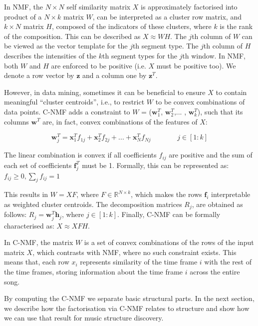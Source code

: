 In NMF, the $N \times N$ self similarity matrix $X$ is approximately factorised into product of a $N \times k$ matrix $W$, can be interpreted as a cluster row matrix, and $k \times N$ matrix $H$, composed of the indicators of these clusters, where $k$ is the rank of the composition. This can be described as $X \approx WH$. The $j$th column of $W$ can be viewed as the vector template for the $j$th segment type. The $j$th column of $H$ describes the intensities of the $k$th segment types for the $j$th window. In NMF, both $W$ and $H$ are enforced to be positive (i.e. $X$ must be positive too). We denote a row vector by $\boldsymbol{z}$ and a column one by $\boldsymbol{z}^{T}$.

However, in data mining, sometimes it can be beneficial to ensure $X$ to contain meaningful “cluster centroids”, i.e., to restrict $W$ to be convex combinations of data points.
C-NMF adds a constraint to $W$ = ($\boldsymbol{w}_{1}^{T}$, $\boldsymbol{w}_{2}^{T}$,... ,  $\boldsymbol{w}_{k}^{T}$),  such that its columns  $\boldsymbol{w}^{T}$  are, in fact,  convex combinations of the features of $X$:

\begin{equation}
\boldsymbol{w}_{j}^{T} = \boldsymbol{x}_{1}^{T}f_{1j} + \boldsymbol{x}_{2}^{T}f_{2j} + ... + \boldsymbol{x}_{N}^{T}f_{Nj}  \hspace{45pt}   j \in [1 : k]
\end{equation}

The linear combination is convex if all coefficients $f_{ij}$ are positive and the sum of each set of coefficients  $\boldsymbol{f}^{T}_{j}$ must be 1. Formally, this can be represented as:
$f_{ij} \geq 0,  \sum\nolimits_{j} f_{ij} = 1 $

This results in $W = XF$, where $F \in \mathbb{R}^{N \times k}$, which makes the rows $\boldsymbol{f}_{i}$ interpretable as weighted cluster centroids. The decomposition matrices $R_{j}$, are obtained as follows:  $R_{j} =  \boldsymbol{w}^{T}_{j}\boldsymbol{h}_{j}$, where $j \in [1 : k]$. Finally, C-NMF can be formally characterised as: $X \approx XFH$.

In C-NMF, the matrix $W$ is a set of convex combinations of the rows of the input matrix $X$, which contrasts with NMF, where no such constraint exists. This means that, each row $x_{i}$ represents similarity of the time frame $i$ with the rest of the time frames, storing information about the time frame $i$ across the entire song.

By computing the C-NMF we separate basic structural parts. In the next section, we describe how the factorisation via C-NMF relates to structure and show how we can use that result for music structure discovery. 

